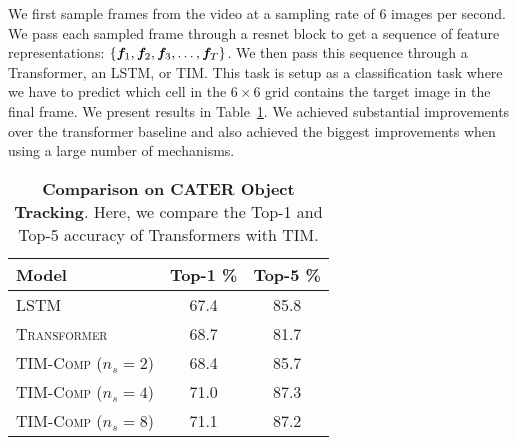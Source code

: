 \documentclass{article}
\newcommand{\highlight}[1]{\colorbox{blue!10}{#1}}
\begin{document}
We first sample frames from the video at a sampling rate of 6 images per second. We pass each sampled frame through a resnet block to get a sequence of feature representations: $\{{\bm{f}}_1, {\bm{f}}_2, {\bm{f}}_3, \ldots, {\bm{f}}_T\}$. We then pass this sequence through a Transformer, an LSTM, or TIM. This task is setup as a classification task where we have to predict which cell in the $6\times6$ grid contains the target image in the final frame.  We present results in Table~\ref{tab:cater_results}.  We achieved substantial improvements over the transformer baseline and also achieved the biggest improvements when using a large number of mechanisms.  

\begin{table}[hp]
    \centering
    \vspace{-4mm}
    \caption{\textbf{Comparison on CATER Object Tracking}. Here, we compare the Top-1 and Top-5 accuracy of Transformers with TIM. }
    \label{tab:cater_results}
    \renewcommand{\arraystretch}{1.0}
    \begin{tabular}{|l|c|c|}
    \hline
     \textbf{Model}  & \textbf{Top-1} \% & \textbf{Top-5} \% \\
     \hline
     \textsc{LSTM} & 67.4 & 85.8 \\
     \textsc{Transformer}  & 68.7  & 81.7 \\
     \textsc{TIM-Comp ($n_s=2$)} & 68.4 & 85.7  \\
     \textsc{TIM-Comp ($n_s=4$)} & 71.0 & \highlight{87.3} \\
     \textsc{TIM-Comp ($n_s=8$)} & \highlight{71.1} & 87.2 \\
\hline    
    \end{tabular}
\end{table}


\end{document}
